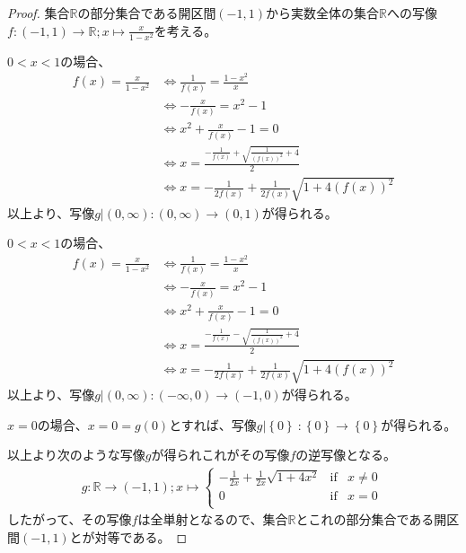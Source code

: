 \documentclass[dvipdfmx]{jsarticle}
\begin{document}
\begin{proof}
集合$\mathbb{R}$の部分集合である開区間$( - 1,1)$から実数全体の集合$\mathbb{R}$への写像$f:( - 1,1) \rightarrow \mathbb{R};x \mapsto \frac{x}{1 - x^{2}}$を考える。\par
$0 < x < 1$の場合、
\begin{align*}
f(x) = \frac{x}{1 - x^{2}} &\Leftrightarrow \frac{1}{f(x)} = \frac{1 - x^{2}}{x}\\
&\Leftrightarrow - \frac{x}{f(x)} = x^{2} - 1\\
&\Leftrightarrow x^{2} + \frac{x}{f(x)} - 1 = 0\\
&\Leftrightarrow x = \frac{- \frac{1}{f(x)} + \sqrt{\frac{1}{\left( f(x) \right)^{2}} + 4}}{2} \\
&\Leftrightarrow x = - \frac{1}{2f(x)} + \frac{1}{2f(x)}\sqrt{1 + 4\left( f(x) \right)^{2}}
\end{align*}
以上より、写像$g|(0,\infty):(0,\infty) \rightarrow (0,1)$が得られる。\par
$0 < x < 1$の場合、
\begin{align*}
f(x) = \frac{x}{1 - x^{2}} &\Leftrightarrow \frac{1}{f(x)} = \frac{1 - x^{2}}{x}\\
&\Leftrightarrow - \frac{x}{f(x)} = x^{2} - 1\\
&\Leftrightarrow x^{2} + \frac{x}{f(x)} - 1 = 0\\
&\Leftrightarrow x = \frac{- \frac{1}{f(x)} - \sqrt{\frac{1}{\left( f(x) \right)^{2}} + 4}}{2} \\
&\Leftrightarrow x = - \frac{1}{2f(x)} + \frac{1}{2f(x)}\sqrt{1 + 4\left( f(x) \right)^{2}}
\end{align*}
以上より、写像$g|(0,\infty):( - \infty,0) \rightarrow ( - 1,0)$が得られる。\par
$x = 0$の場合、$x = 0 = g(0)$とすれば、写像$g|\left\{ 0 \right\}\ :\left\{ 0 \right\} \rightarrow \left\{ 0 \right\}$が得られる。\par
以上より次のような写像$g$が得られこれがその写像$f$の逆写像となる。
\begin{align*}
g:\mathbb{R} \rightarrow ( - 1,1);x \mapsto \left\{ \begin{matrix}
 - \frac{1}{2x} + \frac{1}{2x}\sqrt{1 + 4x^{2}} & \mathrm{if} & x \neq 0 \\
0 & \mathrm{if} & x = 0 \\
\end{matrix} \right.\ 
\end{align*}
したがって、その写像$f$は全単射となるので、集合$\mathbb{R}$とこれの部分集合である開区間$( - 1,1)$とが対等である。\par

\end{proof}
\end{document}
